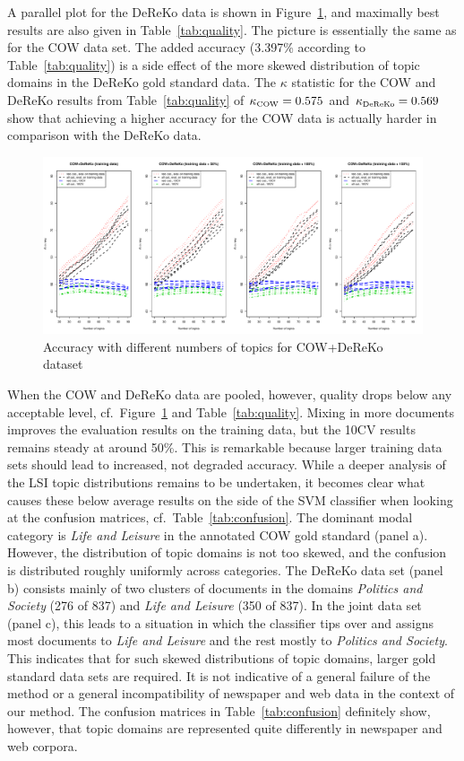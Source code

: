 \documentclass[11pt]{article}
\begin{document}
A parallel plot for the DeReKo data is shown in Figure~\ref{fig:coreko}, and maximally best results are also given in Table~\ref{tab:quality}.
The picture is essentially the same as for the COW data set.
The added accuracy (3.397\% according to Table~\ref{tab:quality}) is a side effect of the more skewed distribution of topic domains in the DeReKo gold standard data.
The $\kappa$ statistic for the COW and DeReKo results from Table~\ref{tab:quality} of $\kappa_{\textrm{\tiny COW}}=0.575$ and $\kappa_{\textrm{\tiny DeReKo}}=0.569$ show that achieving a higher accuracy for the COW data is actually harder in comparison with the DeReKo data.

\begin{figure}[h]
  \centering
  \includegraphics[width=\textwidth]{graphics/coreko.pdf}
  \caption{Accuracy with different numbers of topics for COW+DeReKo dataset}
  \label{fig:coreko}
\end{figure}

When the COW and DeReKo data are pooled, however, quality drops below any acceptable level, cf.\ Figure~\ref{fig:coreko} and Table~\ref{tab:quality}.
Mixing in more documents improves the evaluation results on the training data, but the 10CV results remains steady at around 50\%.
This is remarkable because larger training data sets should lead to increased, not degraded accuracy.
While a deeper analysis of the LSI topic distributions remains to be undertaken, it becomes clear what causes these below average results on the side of the SVM classifier when looking at the confusion matrices, cf.\ Table~\ref{tab:confusion}.
The dominant modal category is \textit{Life and Leisure} in the annotated COW gold standard (panel a).
However, the distribution of topic domains is not too skewed, and the confusion is distributed roughly uniformly across categories.
The DeReKo data set (panel b) consists mainly of two clusters of documents in the domains \textit{Politics and Society} (276 of 837) and \textit{Life and Leisure} (350 of 837).
In the joint data set (panel c), this leads to a situation in which the classifier tips over and assigns most documents to \textit{Life and Leisure} and the rest mostly to \textit{Politics and Society}.
This indicates that for such skewed distributions of topic domains, larger gold standard data sets are required.
It is not indicative of a general failure of the method or a general incompatibility of newspaper and web data in the context of our method.
The confusion matrices in Table~\ref{tab:confusion} definitely show, however, that topic domains are represented quite differently in newspaper and web corpora.
\end{document}
